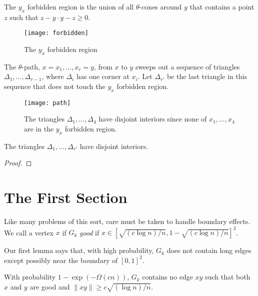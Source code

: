 \documentclass{patmorin}
\begin{document}
The $y_x$ forbidden region is the union of all $\theta$-cones
around $y$ that contains a point $z$ such that $z-y\cdot y-z \ge 0$.

\begin{figure}
  \begin{center}
    \texttt{[image: forbidden]}
  \end{center}
  \caption{The $y_x$ forbidden region}
\end{figure}



The $\theta$-path, $x=x_1,\ldots,x_r=y$, from $x$ to $y$ sweeps out a
sequence of triangles $\Delta_1,\ldots,\Delta_{r-1}$, where $\Delta_i$
has one corner at $x_i$.  Let $\Delta_{r'}$ be the last triangle in this
sequence that does not touch the $y_x$ forbidden region.

\begin{figure}
  \begin{center}
    \texttt{[image: path]}
  \end{center}
  \caption{The triangles $\Delta_1,\ldots,\Delta_4$ have disjoint
  interiors since none of $x_1,\ldots,x_4$ are in the $y_x$ forbidden
  region.}
\end{figure}

\begin{lem}
  The triangles $\Delta_1,\ldots,\Delta_{r'}$ have disjoint interiors.
\end{lem}

\begin{proof}

\end{proof}


\section{The First Section}

Like many problems of this sort, care must be taken to handle
boundary effects.  We call a vertex $x$ if $G_k$ \emph{good} if
$x\in\left[\sqrt{(c\log n)/n},1-\sqrt{(c\log n)/n}\right]^2$.

Our first lemma says that, with high probability, $G_k$ does not
contain long edges except possibly near the boundary of $[0,1]^2$.

\begin{lem}
  With probability $1-\exp(-\Omega(cn))$, $G_k$ contains no edge
  $xy$ such that both $x$ and $y$ are good and $\|xy\|\ge c\sqrt{(\log n)/n}$.
\end{lem}
\end{document}
